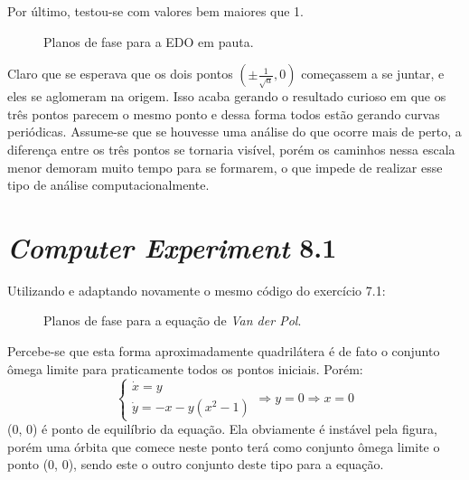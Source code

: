 \documentclass{article}[twocolumn]
\begin{document}
	Por \'ultimo, testou-se com valores bem maiores que 1.
	\begin{figure}[H]
		\centering
		\caption{Planos de fase para a EDO em pauta.}
	\end{figure}
	Claro que se esperava que os dois pontos $(\pm\frac{1}{\sqrt{a}}, 0)$ come\c{c}assem a
	se juntar, e eles se aglomeram na origem. Isso acaba gerando o resultado curioso em que
	os tr\^es pontos parecem o mesmo ponto e dessa forma todos est\~ao gerando curvas peri\'odicas.
	Assume-se que se houvesse uma an\'alise do que ocorre mais de perto, a diferen\c{c}a entre os
	tr\^es pontos se tornaria vis\'ivel, por\'em os caminhos nessa escala menor demoram muito tempo
	para se formarem, o que impede de realizar esse tipo de an\'alise computacionalmente.
	\section{\textit{Computer Experiment} 8.1}
	Utilizando e adaptando novamente o mesmo c\'odigo do exerc\'icio 7.1:
	\begin{figure}[H]
		\centering
		\caption{Planos de fase para a equa\c{c}\~ao de \textit{Van der Pol}.}
	\end{figure}
	Percebe-se que esta forma aproximadamente quadril\'atera \'e de fato o conjunto \^omega
	limite para praticamente todos os pontos iniciais. Por\'em:
	\begin{equation}
		\left\{\begin{array}{c}
			\dot{x} = y\\
			\dot{y} = -x - y(x^2 - 1)
		\end{array}\right.
		\Rightarrow y = 0 \Rightarrow x = 0
		\nonumber
	\end{equation}
	(0, 0) \'e ponto de equil\'ibrio da equa\c{c}\~ao. Ela obviamente \'e inst\'avel pela figura,
	por\'em uma \'orbita que comece neste ponto ter\'a como conjunto \^omega limite o ponto
	(0, 0), sendo este o outro conjunto deste tipo para a equa\c{c}\~ao.
\end{document}
